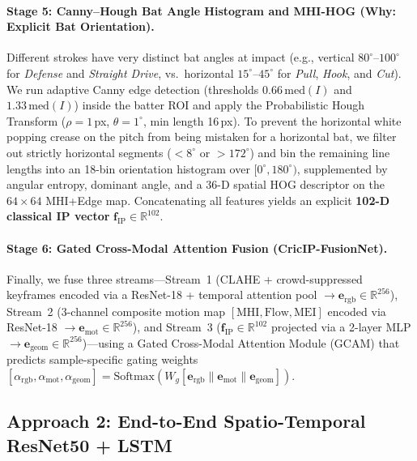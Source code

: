 \paragraph{Stage 5: Canny--Hough Bat Angle Histogram and MHI-HOG (Why: Explicit Bat Orientation).}
Different strokes have very distinct bat angles at impact (e.g., vertical $80^\circ$--$100^\circ$ for \textit{Defense} and \textit{Straight Drive}, vs.\ horizontal $15^\circ$--$45^\circ$ for \textit{Pull}, \textit{Hook}, and \textit{Cut}). We run adaptive Canny edge detection (thresholds $0.66\,\text{med}(I)$ and $1.33\,\text{med}(I)$) inside the batter ROI and apply the Probabilistic Hough Transform ($\rho=1$\,px, $\theta=1^\circ$, min length 16\,px). To prevent the horizontal white popping crease on the pitch from being mistaken for a horizontal bat, we filter out strictly horizontal segments ($<8^\circ$ or $>172^\circ$) and bin the remaining line lengths into an 18-bin orientation histogram over $[0^\circ, 180^\circ)$, supplemented by angular entropy, dominant angle, and a 36-D spatial HOG descriptor on the $64\times64$ MHI+Edge map. Concatenating all features yields an explicit \textbf{102-D classical IP vector} $\mathbf{f}_{\text{IP}} \in \mathbb{R}^{102}$.

\paragraph{Stage 6: Gated Cross-Modal Attention Fusion (\textbf{CricIP-FusionNet}).}
Finally, we fuse three streams—Stream~1 (CLAHE + crowd-suppressed keyframes encoded via a ResNet-18 + temporal attention pool $\rightarrow \mathbf{e}_{\text{rgb}} \in \mathbb{R}^{256}$), Stream~2 (3-channel composite motion map $[\text{MHI}, \text{Flow}, \text{MEI}]$ encoded via ResNet-18 $\rightarrow \mathbf{e}_{\text{mot}} \in \mathbb{R}^{256}$), and Stream~3 ($\mathbf{f}_{\text{IP}} \in \mathbb{R}^{102}$ projected via a 2-layer MLP $\rightarrow \mathbf{e}_{\text{geom}} \in \mathbb{R}^{256}$)—using a Gated Cross-Modal Attention Module (GCAM) that predicts sample-specific gating weights $[\alpha_{\text{rgb}}, \alpha_{\text{mot}}, \alpha_{\text{geom}}] = \text{Softmax}(W_g[\mathbf{e}_{\text{rgb}} \| \mathbf{e}_{\text{mot}} \| \mathbf{e}_{\text{geom}}])$.

\subsection{Approach 2: End-to-End Spatio-Temporal ResNet50 + LSTM}
\label{sec:method_lstm}

